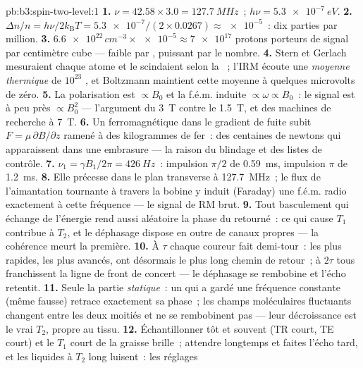 \begin{solution}{pb:b3:spin-two-level:1}
\textbf{1.} $\nu = 42.58 \times 3.0 = \qty{127.7}{MHz}$~; $h\nu =
\qty{5.3e-7}{eV}$.
\textbf{2.} $\Delta n/n = h\nu/2k_{\text{B}}T = \num{5.3e-7}/(2
\times 0.0267) \approx \num{e-5}$~: dix parties par million.
\textbf{3.} $\num{6.6e22}\,\unit{cm^{-3}} \times \num{e-5} \approx
\num{7e17}$ protons porteurs de signal par centimètre cube --- faible
par , puissant par le nombre.
\textbf{4.} Stern et Gerlach mesuraient chaque atome et le
scindaient selon la ~; l'IRM écoute une \emph{moyenne
thermique} de $10^{23}$ , et Boltzmann maintient cette moyenne à
quelques microvolts de zéro.
\textbf{5.} La polarisation est $\propto B_0$ et la f.é.m. induite
$\propto \omega \propto B_0$~: le signal est à peu près
$\propto B_0^2$ --- l'argument du \qty{3}{T} contre le \qty{1.5}{T},
et des machines de recherche à \qty{7}{T}.
\textbf{6.} Un ferromagnétique dans le gradient de fuite subit
$F = \mu\,\partial B/\partial z$ ramené à des kilogrammes de fer~:
des centaines de newtons qui apparaissent dans une embrasure --- la
raison du blindage et des listes de contrôle.
\textbf{7.} $\nu_1 = \gamma B_1/2\pi = \qty{426}{Hz}$~: impulsion
$\pi/2$ de \qty{0.59}{ms}, impulsion $\pi$ de \qty{1.2}{ms}.
\textbf{8.} Elle précesse dans le plan transverse à
\qty{127.7}{MHz}~; le flux de l'aimantation tournante à travers la
bobine y induit (Faraday) une f.é.m. radio exactement à cette
fréquence --- le signal de RM brut.
\textbf{9.} Tout basculement qui échange de l'énergie rend aussi
aléatoire la phase du  retourné~: ce qui cause $T_1$ contribue à
$T_2$, et le déphasage dispose en outre de canaux propres --- la
cohérence meurt la première.
\textbf{10.} À $\tau$ chaque coureur fait demi-tour~: les plus
rapides, les plus avancés, ont désormais le plus long chemin de
retour~; à $2\tau$ tous franchissent la ligne de front de concert ---
le déphasage se rembobine et l'écho retentit.
\textbf{11.} Seule la partie \emph{statique}~: un  qui a gardé
une fréquence constante (même fausse) retrace exactement sa phase~;
les champs moléculaires fluctuants changent entre les deux moitiés et
ne se rembobinent pas --- leur décroissance est le vrai $T_2$, propre
au tissu.
\textbf{12.} Échantillonner tôt et souvent (TR court, TE court) et
le $T_1$ court de la graisse brille~; attendre longtemps et faites
l'écho tard, et les liquides à $T_2$ long luisent~: les réglages

\end{solution}
